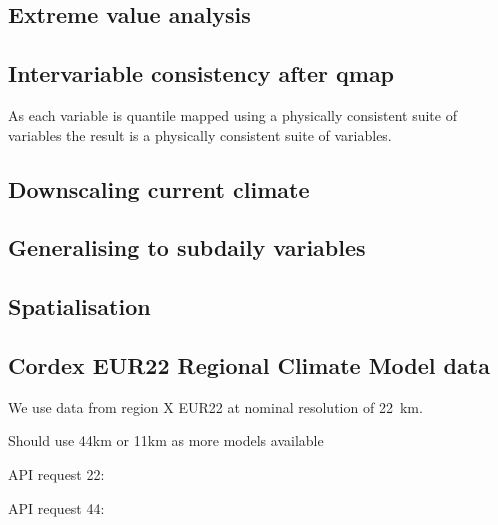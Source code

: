 
\subsection{Extreme value analysis}
\subsection{Intervariable consistency after qmap}
As each variable is quantile mapped using a physically consistent suite of variables the result is a physically consistent suite of variables.
\subsection{Downscaling current climate}

\subsection{Generalising to subdaily variables}

\subsection{Spatialisation}
\subsection{Cordex EUR22 Regional Climate Model data}
We use data from region X EUR22 at nominal resolution of 22~km.

Should use 44km or 11km as more models available

API request 22:

API request 44:



